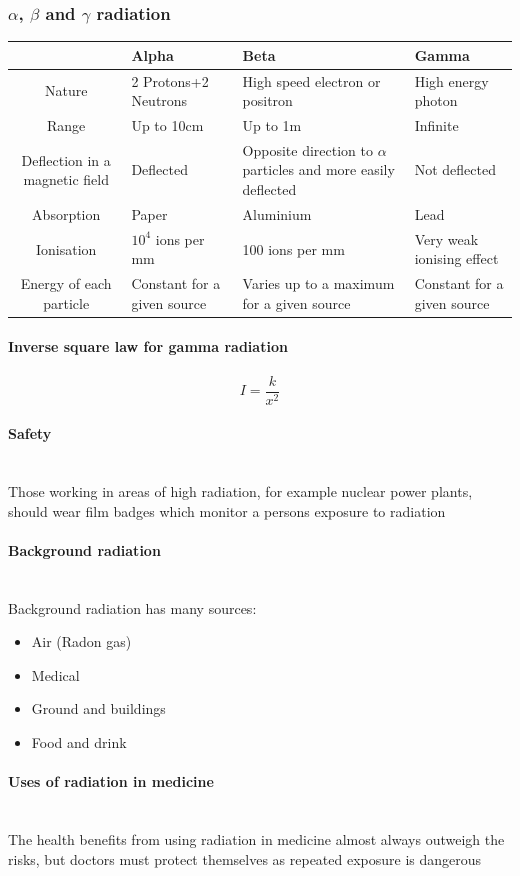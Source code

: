 \documentclass[12pt]{article}
\begin{document}
\subsubsection{$\alpha$, $\beta$ and $\gamma$ radiation}
\begin{tabularx}{\textwidth}{|c|X|X|X|}
\hline
&Alpha&Beta&Gamma\\
\hline
Nature&2 Protons+2 Neutrons&High speed electron or positron&High energy photon\\
\hline
Range&Up to 10cm&Up to 1m&Infinite\\
\hline 
Deflection in a magnetic field&Deflected&Opposite direction to $\alpha$ particles and more easily deflected&Not deflected\\
\hline
Absorption&Paper&Aluminium&Lead \\
\hline
Ionisation&$10^4$ ions per mm&100 ions per mm&Very weak ionising effect\\
\hline
Energy of each particle&Constant for a given source&Varies up to a maximum for a given source&Constant for a given source\\
\hline
\end{tabularx}
\paragraph{Inverse square law for gamma radiation}
$$I=\frac{k}{x^2}$$
\paragraph{Safety}$ $\\
Those working in areas of high radiation, for example nuclear power plants, should wear film badges which monitor a persons exposure to radiation
\paragraph{Background radiation}$ $\\
Background radiation has many sources:
\begin{itemize}
\item Air (Radon gas)
\item Medical
\item Ground and buildings
\item Food and drink
\end{itemize}
\paragraph{Uses of radiation in medicine}$ $\\
The health benefits from using radiation in medicine almost always outweigh the risks, but doctors must protect themselves as repeated exposure is dangerous
\end{document}
